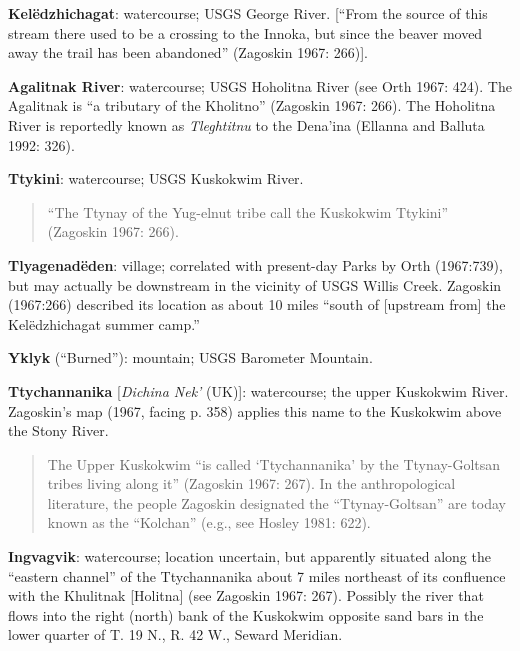 \begin{hang}
\textbf{Kelëdzhichagat}: watercourse; USGS George River. [“From the source of this stream there used to be a crossing to the Innoka, but since the beaver moved away the trail has been abandoned” (Zagoskin 1967: 266)].



\textbf{Agalitnak River}: watercourse; USGS Hoholitna River (see Orth 1967: 424). The Agalitnak is “a tributary of the Kholitno” (Zagoskin 1967: 266). The Hoholitna River is reportedly known as \textit{Tleghtitnu} to the Dena’ina (Ellanna and Balluta 1992: 326).



\textbf{Ttykini}: watercourse; USGS Kuskokwim River.



\begin{quote}“The Ttynay of the Yug-elnut tribe call the Kuskokwim Ttykini” (Zagoskin 1967: 266).
\end{quote}



\textbf{Tlyagenadëden}: village; correlated with present-day Parks by Orth (1967:739), but may actually be downstream in the vicinity of USGS Willis Creek. Zagoskin (1967:266) described its location as about 10 miles “south of [upstream from] the Kelëdzhichagat summer camp.”



\textbf{Yklyk} (“Burned”): mountain; USGS Barometer Mountain.



\textbf{Ttychannanika} [\textit{Dichina Nek’} (UK)]: watercourse; the upper Kuskokwim River. Zagoskin’s map (1967, facing p. 358) applies this name to the Kuskokwim above the Stony River.



\begin{quote}The Upper Kuskokwim “is called ‘Ttychannanika’ by the Ttynay-Goltsan tribes living along it” (Zagoskin 1967: 267). In the anthropological literature, the people Zagoskin designated the “Ttynay-Goltsan” are today known as the “Kolchan” (e.g., see Hosley 1981: 622).
\end{quote}



\textbf{Ingvagvik}: watercourse; location uncertain, but apparently situated along the “eastern channel” of the Ttychannanika about 7 miles northeast of its confluence with the Khulitnak [Holitna] (see Zagoskin 1967: 267). Possibly the river that flows into the right (north) bank of the Kuskokwim opposite sand bars in the lower quarter of T. 19 N., R. 42 W., Seward Meridian.




\end{hang}
